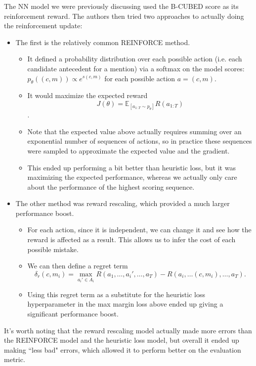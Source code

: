 The NN model we were previously discussing used the B-CUBED score as its reinforcement reward. The authors then tried two approaches to actually doing the reinforcement update:
\begin{itemize}
\item The first is the relatively common REINFORCE method. 
\begin{itemize}
\item It defined a probability distribution over each possible action (i.e. each candidate antecedent for a mention) via a softmax on the model scores: $p_{\theta}\left((c, m)\right) \propto e^{s(c, m)}$ for each possible action $a = (c,m)$.
\item It would maximize the expected reward 
$$J(\theta) = \mathbb{E}_{\left[a_{1:T} \sim p_\theta\right]}R(a_{1:T})$$.
\item Note that the expected value above actually requires summing over an exponential number of sequences of actions, so in practice these sequences were sampled to approximate the expected value and the gradient.
\item This ended up performing a bit better than heuristic loss, but it was maximizing the expected performance, whereas we actually only care about the performance of the highest scoring sequence.
\end{itemize}
\item The other method was reward rescaling, which provided a much larger performance boost.
\begin{itemize}
\item For each action, since it is independent, we can change it and see how the reward is affected as a result. This allows us to infer the cost of each possible mistake.
\item We can then define a regret term
$$\delta_r\left(c, m_i\right) = \max_{a_i' \in A_i} R\left(a_1, \dots, a_i', \dots, a_T\right) - R\left(a_i, \dots (c, m_i), \dots, a_T\right).$$
\item Using this regret term as a substitute for the heuristic loss hyperparameter in the max margin loss above ended up giving a significant performance boost.
\end{itemize}
\end{itemize}
It's worth noting that the reward rescaling model actually made more errors than the REINFORCE model and the heuristic loss model, but overall it ended up making ``less bad" errors, which allowed it to perform better on the evaluation metric.
